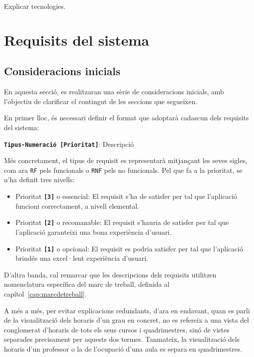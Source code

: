 \documentclass[a4paper,12pt]{ThesisStyle}
\begin{document}
Explicar tecnologies.

\chapter{Requisits del sistema}
\label{cap:requisits}

\section{Consideracions inicials}
\label{sec:consideracions_inicials}

En aquesta secció, es realitzaran una sèrie de consideracions inicials, amb l'objectiu de clarificar el contingut de les seccions que segueixen.

En primer lloc, és necessari definir el format que adoptarà cadascun dels requisits del sistema:
\vspace*{-0.4cm}
\begin{center}
  \texttt{\textbf{Tipus-Numeració [Prioritat]}}: Descripció
\end{center}

Més concretament, el tipus de requisit es representarà mitjançant les seves sigles, com ara \texttt{RF} pels funcionals o \texttt{RNF} pels no funcionals. Pel que fa a la prioritat, se n'ha definit tres nivells:
\begin{itemize}
  \item Prioritat \texttt{\textbf{[3]}} o essencial: El requisit s'ha de satisfer per tal que l'aplicació funcioni correctament, a nivell elemental.
  \item Prioritat \texttt{\textbf{[2]}} o recomanable: El requisit s'hauria de satisfer per tal que l'aplicació garanteixi una bona experiència d'usuari.
  \item Prioritat \texttt{\textbf{[1]}} o opcional: El requisit es podria satisfer per tal que l'aplicació brindés una excel·lent experiència d'usuari.
\end{itemize}

D'altra banda, cal remarcar que les descripcions dels requisits utilitzen nomenclatura específica del marc de treball, definida al capítol~\ref{cap:marcdetreball}.

A més a més, per evitar explicacions redundants, d'ara en endavant, quan es parli de la visualització dels horaris d'un grau en concret, no es refereix a una vista del conglomerat d'horaris de tots els seus cursos i quadrimestres, sinó de vistes separades precisament per aquests dos termes. Tanmateix, la visualització dels horaris d'un professor o la de l'ocupació d'una aula es separa en quadrimestres.
\end{document}
